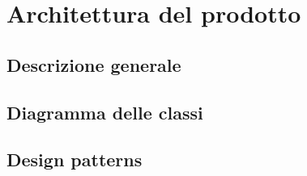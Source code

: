 \section{Architettura del prodotto}

\subsection{Descrizione generale}

\subsection{Diagramma delle classi}

\subsection{Design patterns}